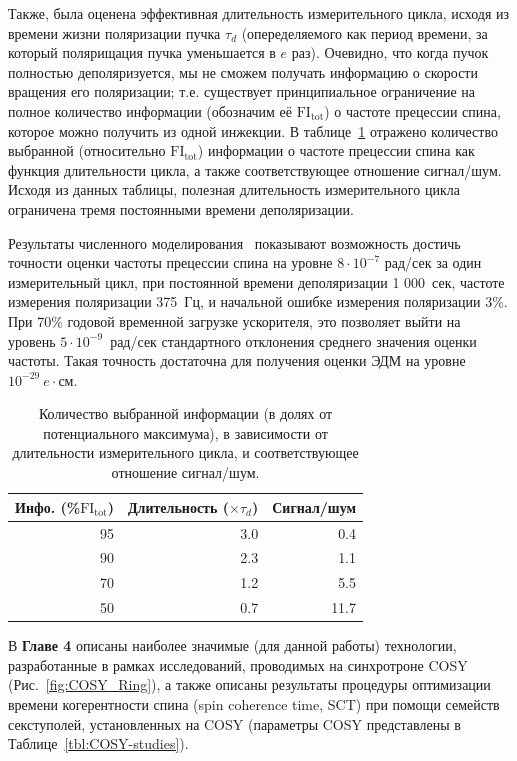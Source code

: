 Также, была оценена эффективная длительность измерительного цикла, 
исходя из времени жизни поляризации пучка  $\tau_d$ (опеределяемого как период времени, 
за который полярищация пучка уменьшается в $e$ раз). Очевидно, что когда пучок полностью деполяризуется, 
мы не сможем получать информацию о скорости вращения его поляризации; т.е. 
существует принципиальное ограничение на полное количество информации (обозначим её $\mathrm{FI_{tot}}$) 
о частоте прецессии спина, которое можно получить из одной инжекции.
В таблице~\ref{tbl:FItot} отражено количество выбранной (относительно $\mathrm{FI_{tot}}$) информации 
о частоте прецессии спина как функция длительности цикла, а также соответствующее отношение
сигнал/шум. Исходя из данных таблицы, полезная длительность измерительного цикла 
ограничена тремя постоянными времени деполяризации.

Результаты численного моделирования~\cite{Aksentev:Stats} показывают 
возможность достичь точности оценки частоты прецессии спина 
на уровне ${8\cdot 10^{-7}}$ рад/сек за один измерительный цикл, при постоянной времени деполяризации 
1 000~сек, частоте измерения поляризации 375~Гц, и начальной ошибке измерения поляризации 3\%. 
При 70\%  годовой временной загрузке ускорителя, это позволяет выйти на уровень 
${5\cdot 10^{-9}}$~рад/сек стандартного отклонения среднего значения оценки частоты. 
Такая точность достаточна для получения оценки ЭДМ на уровне $10^{-29}~e\cdot$см.

\begin{table}[H]
	\caption{Количество выбранной информации (в долях от потенциального максимума), 
		в зависимости от длительности измерительного цикла, 
		и соответствующее отношение сигнал/шум.\label{tbl:FItot}}
	\centering
	\begin{tabular}{rrr}
		\toprule
		Инфо. (\%$\mathrm{FI_{tot}}$) & Длительность ($\times\tau_d$) & Сигнал/шум  \\
		\midrule
		95            & 3.0                     & 0.4         \\
		90            & 2.3                     & 1.1         \\
		70            & 1.2                     & 5.5         \\
		50            & 0.7                     & 11.7        \\
		\bottomrule
	\end{tabular}
\end{table}

В \textbf{Главе 4} описаны наиболее значимые (для данной работы) технологии, 
разработанные в рамках исследований, проводимых на синхротроне COSY (Рис.~\ref{fig:COSY_Ring}), 
а также описаны результаты процедуры оптимизации времени когерентности спина (spin coherence time, SCT) 
при помощи семейств секступолей, установленных на COSY
(параметры COSY  представлены в Таблице~\ref{tbl:COSY-studies}).

